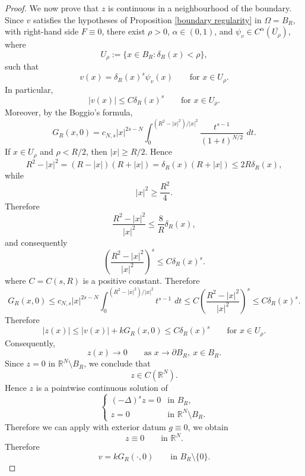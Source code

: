 \documentclass[11pt,a4paper]{article}
\newcommand{\dd}{\,d}
\begin{document}
\begin{proof}
We now prove that \(z\) is continuous in a neighbourhood of the boundary. 
Since \(v\) satisfies the hypotheses of
Proposition \ref{boundary regularity} in \(\Omega=B_R\), with
right-hand side \(F\equiv0\), there exist \(\rho>0\), \(\alpha\in(0,1)\), and
\(\psi_v\in C^\alpha(\overline{U_\rho})\), where
\[
U_\rho:=\{x\in B_R:\delta_R(x)<\rho\},
\]
such that
\[
v(x)=\delta_R(x)^s\psi_v(x)
\qquad\text{for }x\in U_\rho.
\]
In particular,
\[
|v(x)|\le C\delta_R(x)^s
\qquad\text{for }x\in U_\rho.
\]
Moreover, by the Boggio's formula,
\[
G_R(x,0)
=
c_{N,s}|x|^{2s-N}
\int_0^{(R^2-|x|^2)/|x|^2}
\frac{t^{s-1}}{(1+t)^{N/2}}\,\dd t .
\]
If \(x\in U_\rho\) and \(\rho<R/2\), then \(|x|\ge R/2\). Hence
\[
R^2-|x|^2=(R-|x|)(R+|x|)
=\delta_R(x)(R+|x|)
\le 2R\delta_R(x),
\]
while
\[
|x|^2\ge \frac{R^2}{4}.
\]
Therefore
\[
\frac{R^2-|x|^2}{|x|^2}
\le
\frac{8}{R}\delta_R(x),
\]
and consequently
\[
\left(\frac{R^2-|x|^2}{|x|^2}\right)^s
\le
C\delta_R(x)^s .
\]
where \(C=C(s,R)\) is a positive constant. Therefore
\[
G_R(x,0)
\le
c_{N,s}|x|^{2s-N}
\int_0^{(R^2-|x|^2)/|x|^2}
t^{s-1}\,\dd t \le C \left(\frac{R^2-|x|^2}{|x|^2}\right)^s
\le
C\delta_R(x)^s. 
\]
Therefore
\[
|z(x)|
\le
|v(x)|+kG_R(x,0)
\le
C\delta_R(x)^s
\qquad\text{for }x\in U_\rho.
\]
Consequently,
\[
z(x)\to0
\qquad\text{as }x\to\partial B_R,\ x\in B_R.
\]
Since \(z=0\) in \(\mathbb R^N\setminus B_R\), we conclude that
\[
z\in C(\mathbb R^N).
\]
Hence \(z\) is a pointwise continuous solution of
\[
\begin{cases}
(-\Delta)^s z=0 & \text{in }B_R,\\
z=0 & \text{in }\mathbb R^N\setminus B_R.
\end{cases}
\]
Therefore we can apply 
\cite[Theorem 2.10]{Bucur} with exterior datum
\(g\equiv0\), we obtain
\[
z\equiv0
\qquad\text{in }\mathbb R^N.
\]
Therefore
\[
v=kG_R(\cdot,0)
\qquad\text{in }B_R\setminus\{0\}.
\]
\end{proof}
\end{document}
